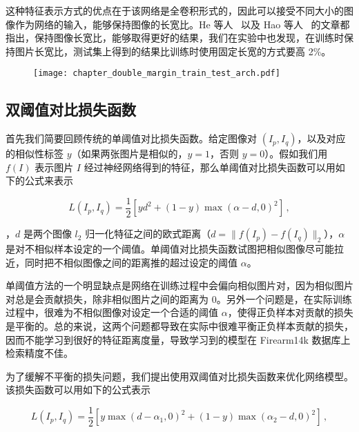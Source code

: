 这种特征表示方式的优点在于该网络是全卷积形式的，因此可以接受不同大小的图像作为网络的输入，能够保持图像的长宽比。He 等人~\cite{He2014SpatialPP} 以及 Hao 等人~\cite{Hao2017MFCAM} 的文章都指出，保持图像长宽比，能够取得更好的结果，我们在实验中也发现，在训练时保持图片长宽比，测试集上得到的结果比训练时使用固定长宽的方式要高 2\%。

\begin{figure}[!t]
  \centering
  \texttt{[image: chapter\_double\_margin\_train\_test\_arch.pdf]}
  \label{fig:train_test_arch}
\end{figure}

\subsection{双阈值对比损失函数}
首先我们简要回顾传统的单阈值对比损失函数。给定图像对 $(I_p, I_q)$，以及对应的相似性标签 $y$（如果两张图片是相似的，$y=1$，否则 $y=0$）。假如我们用 $f(I)$ 表示图片 $I$ 经过神经网络得到的特征，那么单阈值对比损失函数可以用如下的公式来表示

\begin{equation}\label{eq:single_margin_loss}
L(I_p, I_q) = \frac{1}{2}\left[yd^2 + (1-y)\max(\alpha - d, 0)^2\right]\, ,
\end{equation}

，$d$ 是两个图像 $l_2$ 归一化特征之间的欧式距离（$d= \lVert f(I_p)-f(I_q)\rVert_2$），$\alpha$ 是对不相似样本设定的一个阈值。单阈值对比损失函数试图把相似图像尽可能拉近，同时把不相似图像之间的距离推的超过设定的阈值 $\alpha$。

单阈值方法的一个明显缺点是网络在训练过程中会偏向相似图片对，因为相似图片对总是会贡献损失，除非相似图片之间的距离为 0。另外一个问题是，在实际训练过程中，很难为不相似图像对设定一个合适的阈值 $\alpha$，使得正负样本对贡献的损失是平衡的。总的来说，这两个问题都导致在实际中很难平衡正负样本贡献的损失，因而不能学习到很好的特征距离度量，导致学习到的模型在 Firearm14k 数据库上检索精度不佳。

为了缓解不平衡的损失问题，我们提出使用双阈值对比损失函数来优化网络模型。该损失函数可以用如下的公式表示

\begin{equation}\label{eq:double_margin_loss}
L(I_p, I_q) = \frac{1}{2}[y\max(d - {\alpha}_1, 0)^2 + (1-y)\max({\alpha}_2 - d, 0)^2]\, ,
\end{equation}

